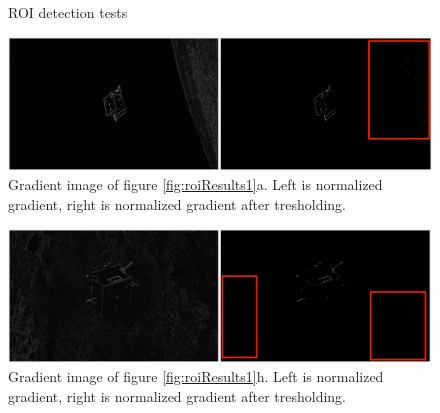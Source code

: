 \begin{figure}[htbp]
  \qquad
  \qquad
  \qquad
  \qquad
  \caption{ROI detection tests}
  \label{fig:roiResults2}
\end{figure}

\begin{figure}[htbp]
  \centering
  \includegraphics[width=1.0\textwidth]{gfx/results/prisma/101/8Select.png}
  \caption{Gradient image of figure \ref{fig:roiResults1}a. Left is normalized gradient, right is normalized gradient after tresholding.}
\end{figure}

\begin{figure}[htbp]
  \centering
  \includegraphics[width=1.0\textwidth]{gfx/results/prisma/117/8Select.png}
  \caption{Gradient image of figure \ref{fig:roiResults1}h. Left is normalized gradient, right is normalized gradient after tresholding.}
\end{figure}


